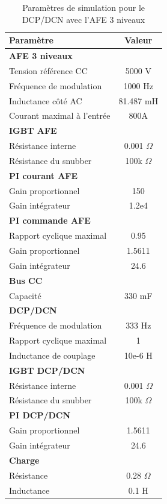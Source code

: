 \begin{table}[htb]
\centering
\begin{tabular}{|l|c|} 
  \hline
  \textbf{Paramètre} & \textbf{Valeur}  \\
  \hline\hline \hline
  \multicolumn{2}{|l|}{\textbf{AFE 3 niveaux}}\\ \hline \hline 
  Tension référence CC & 5000 V\\ \hline
  Fréquence de modulation & 1000 Hz \\ \hline
  Inductance côté AC& 81.487 mH\\ \hline
  Courant maximal à l'entrée& 800A \\ \hline \hline
  \multicolumn{2}{|l|}{\textbf{IGBT AFE}}\\ \hline
  Résistance interne & 0.001 $\Omega$\\
  Résistance du snubber & 100k $\Omega$\\ \hline \hline
   \multicolumn{2}{|l|}{\textbf{PI courant AFE}}\\ \hline
  Gain proportionnel & 150 \\
  Gain intégrateur & 1.2e4 \\ \hline \hline
  \multicolumn{2}{|l|}{\textbf{PI commande AFE}}\\ \hline
  Rapport cyclique maximal & 0.95\\
  Gain proportionnel & 1.5611 \\
  Gain intégrateur & 24.6 \\ \hline \hline
  \multicolumn{2}{|l|}{\textbf{Bus CC}}\\ \hline
  Capacité & 330 mF\\
  \hline \hline \hline
  
  \multicolumn{2}{|l|}{\textbf{DCP/DCN}}\\ \hline \hline
  Fréquence de modulation & 333 Hz\\ \hline
  Rapport cyclique maximal & 1 \\ \hline
  Inductance de couplage & 10e-6 H \\ \hline \hline
  \multicolumn{2}{|l|}{\textbf{IGBT DCP/DCN}}\\ \hline
  Résistance interne & 0.001 $\Omega$\\
  Résistance du snubber & 100k $\Omega$\\ \hline \hline
   \multicolumn{2}{|l|}{\textbf{PI DCP/DCN}}\\ \hline
  Gain proportionnel & 1.5611 \\
  Gain intégrateur & 24.6 \\ \hline \hline
  \multicolumn{2}{|l|}{\textbf{Charge}}\\ \hline
  Résistance & 0.28 $\Omega$\\
  Inductance & 0.1 H \\
  \hline
\end{tabular}
\caption{Paramètres de simulation pour le DCP/DCN avec l'AFE 3 niveaux}
\label{p_AF_DCP}
\end{table}

